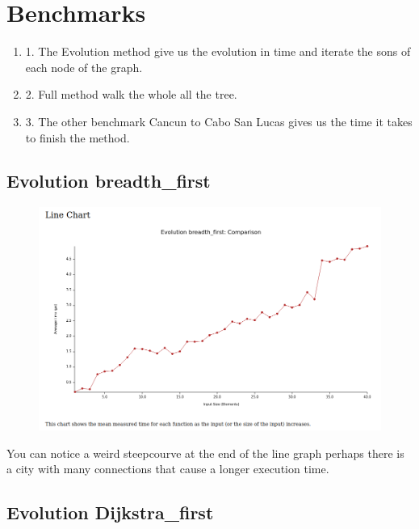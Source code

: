 \newpage
\section{Benchmarks}

\begin{enumerate}[label={}]
\item 1. The Evolution method give us the evolution in time and iterate the sons of each node of the graph.
\item 2. Full method walk the whole all the tree.
\item 3. The other benchmark Cancun to Cabo San Lucas gives us the time it takes to finish the method.
\end{enumerate}

\subsection{Evolution breadth\_first}

\begin{figure}[H]
\centering
\includegraphics[scale=0.4]{../img/Evolution breadth_first}
\end{figure}

You can notice a weird steepcourve at the end of the line graph perhaps there is a city with many
connections that cause a longer execution time.

\subsection{Evolution Dijkstra\_first}

